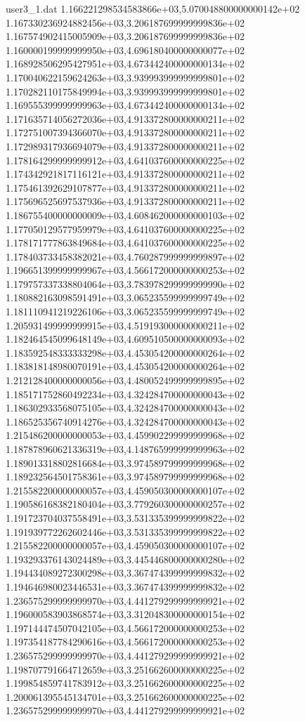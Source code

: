 \begin{filecontents}{user3_1.dat}
1.166221298534583866e+03,5.070048800000000142e+02
1.167330236924882456e+03,3.206187699999999836e+02
1.167574902415005909e+03,3.206187699999999836e+02
1.160000199999999950e+03,4.696180400000000077e+02
1.168928506295427951e+03,4.673442400000000134e+02
1.170040622159624263e+03,3.939993999999999801e+02
1.170282110175849994e+03,3.939993999999999801e+02
1.169555399999999963e+03,4.673442400000000134e+02
1.171635714056272036e+03,4.913372800000000211e+02
1.172751007394366070e+03,4.913372800000000211e+02
1.172989317936694079e+03,4.913372800000000211e+02
1.178164299999999912e+03,4.641037600000000225e+02
1.174342921817116121e+03,4.913372800000000211e+02
1.175461392629107877e+03,4.913372800000000211e+02
1.175696525697537936e+03,4.913372800000000211e+02
1.186755400000000009e+03,4.608462000000000103e+02
1.177050129577959979e+03,4.641037600000000225e+02
1.178171777863849684e+03,4.641037600000000225e+02
1.178403733458382021e+03,4.760287999999999897e+02
1.196651399999999967e+03,4.566172000000000253e+02
1.179757337338804064e+03,3.783978299999999990e+02
1.180882163098591491e+03,3.065235599999999749e+02
1.181110941219226106e+03,3.065235599999999749e+02
1.205931499999999915e+03,4.519193000000000211e+02
1.182464545099648149e+03,4.609510500000000093e+02
1.183592548333333298e+03,4.453054200000000264e+02
1.183818148980070191e+03,4.453054200000000264e+02
1.212128400000000056e+03,4.480052499999999895e+02
1.185171752860492234e+03,4.324284700000000043e+02
1.186302933568075105e+03,4.324284700000000043e+02
1.186525356740914276e+03,4.324284700000000043e+02
1.215486200000000053e+03,4.459902299999999968e+02
1.187878960621336319e+03,4.148765999999999963e+02
1.189013318802816684e+03,3.974589799999999968e+02
1.189232564501758361e+03,3.974589799999999968e+02
1.215582200000000057e+03,4.459050300000000107e+02
1.190586168382180404e+03,3.779260300000000257e+02
1.191723704037558491e+03,3.531335399999999822e+02
1.191939772262602446e+03,3.531335399999999822e+02
1.215582200000000057e+03,4.459050300000000107e+02
1.193293376143024489e+03,3.445446800000000280e+02
1.194434089272300298e+03,3.367474399999999832e+02
1.194646980023446531e+03,3.367474399999999832e+02
1.236575299999999970e+03,4.441279299999999921e+02
1.196000583903868574e+03,3.312048300000000154e+02
1.197144474507042105e+03,4.566172000000000253e+02
1.197354187784290616e+03,4.566172000000000253e+02
1.236575299999999970e+03,4.441279299999999921e+02
1.198707791664712659e+03,3.251662600000000225e+02
1.199854859741783912e+03,3.251662600000000225e+02
1.200061395545134701e+03,3.251662600000000225e+02
1.236575299999999970e+03,4.441279299999999921e+02

\end{filecontents}
